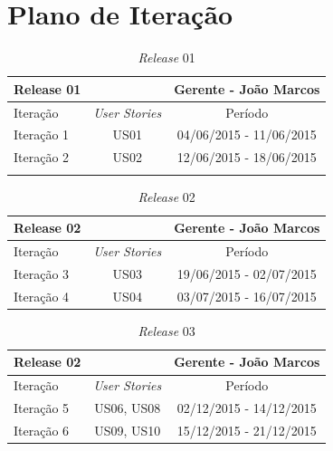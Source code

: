 \documentclass[a4paper,12pt]{monografia}
\begin{document}

\chapter{Plano de Iteração} %
\label{apdc:plano_de_itercao}

\begin{table}[H]
\centering
\caption{\textit{Release} 01}
\label{qua:release01}
\begin{tabular}{|lc|c|}
\rowcolor{ballblue}
\hline
\textbf{Release 01} & & Gerente - João Marcos \\
\hline
Iteração & \textit{\textit{User Stories}} & Período\\
\hline
Iteração 1    & US01           & 04/06/2015 - 11/06/2015\\
Iteração 2    & US02           & 12/06/2015 - 18/06/2015\\
\hline
\rowcolor{ballblue}
\hline				
\end{tabular}
\end{table}

\begin{table}[H]
\centering
\caption{\textit{Release} 02}
\label{qua:release02}
\begin{tabular}{|lc|c|}
\rowcolor{ballblue}
\hline
\textbf{Release 02} & & Gerente - João Marcos \\
\hline
Iteração & \textit{\textit{User Stories}} & Período\\
\hline
Iteração 3    & US03 		   & 19/06/2015 - 02/07/2015\\
Iteração 4    & US04 		   & 03/07/2015 - 16/07/2015\\
\hline
\end{tabular}
\end{table}

\begin{table}[H]
\centering
\caption{\textit{Release} 03}
\label{qua:release03}
\begin{tabular}{|lc|c|}
\rowcolor{ballblue}
\hline
\textbf{Release 02} & & Gerente - João Marcos \\
\hline
Iteração & \textit{\textit{User Stories}} & Período\\
\hline
Iteração 5    & US06, US08    & 02/12/2015 - 14/12/2015\\
Iteração 6    & US09, US10	  & 15/12/2015 - 21/12/2015\\
\hline
\end{tabular}
\end{table}
\end{document}
